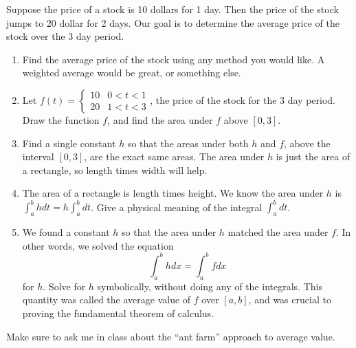 \begin{problem}
 Suppose the price of a stock is 10 dollars for 1 day.  Then the price of the stock jumps to 20 dollar for 2 days.  Our goal is to determine the average price of the stock over the 3 day period. 
\begin{enumerate}
 \item Find the average price of the stock using any method you would like. A weighted average would be great, or something else.
 \item Let $f(t) = \begin{cases}10 &0<t<1\\20&1<t<3\end{cases}$, the price of the stock for the 3 day period. Draw the function $f$, and find the area under $f$ above $[0,3]$.
 \item Find a single constant $h$ so that the areas under both $h$ and $f$, above the interval $[0,3]$, are the exact same areas.  The area under $h$ is just the area of a rectangle, so length times width will help. 
 \item The area of a rectangle is length times height.  We know the area under $h$ is $\int_a^b hdt = h \int_a^bdt$. Give a physical meaning of the integral $\int_a^b dt$.  
 \item We found a constant $h$ so that the area under $h$ matched the area under $f$. In other words, we solved the equation $$\int_a^b h dx = \int_a^b f dx$$ for $h$.  Solve for $h$ symbolically, without doing any of the integrals. This quantity was called the average value of $f$ over $[a,b]$, and was crucial to proving the fundamental theorem of calculus.
\end{enumerate}
\end{problem}

Make sure to ask me in class about the ``ant farm'' approach to average value.

